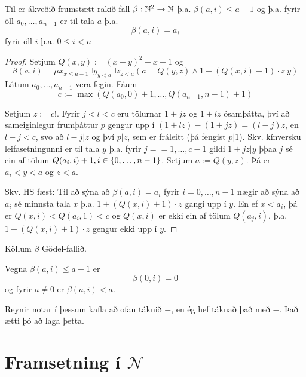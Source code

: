 \documentclass[12pt]{book}
\begin{document}
\begin{setn}
  Til er ákveðið frumstætt rakið fall $\beta: \mathbb{N}^2 \to \mathbb{N}$
  þ.a. $\beta (a,i) \leq a - 1$ og þ.a. fyrir öll $a_0, \dotsc, a_{n-1}$ er til
  tala $a$ þ.a.
  \[\beta(a,i) = a_i \]
  fyrir öll $i$ þ.a. $0 \leq i < n$
  \begin{proof}
    Setjum $Q(x,y) := (x+y)^2 + x +1$ og
    \[ \beta(a,i) = \mu x_{x \leq a - 1} \exists y_{y<a} \exists z_{z<a} (a = Q(y,z) \wedge 1 + (Q(x,i)+1) \cdot z | y ) \]
    Látum $a_0, \dotsc, a_{n-1}$ vera fegin. Fáum
    \[ c:= \max (Q(a_0,0) + 1, \dotsc, Q(a_{n-1},n-1) +1 ) \]
    
    Setjum $ z := c!$. Fyrir $j < l < c$ eru tölurnar
    $1 +jz$ og $1 + lz$ ósamþátta, því að sameiginlegur frumþáttur
    $p$ gengur upp í $(1+lz) - (1+jz) = (l-j)z$, en $l-j < c$, svo að
    $l-j | z$ og því $p|z$, sem er fráleitt (þá fengist $p | 1$). Skv.
    kínversku leifasetningunni er til tala $y$ þ.a. fyrir $j = =1, \dotsc, c-1$
    gildi $1+jz|y$ þþaa $j$ sé ein af tölum $Q(a_i,i)+1, i \in \{0,\dotsc,n-1\}$.
    Setjum $a := Q(y,z)$. Þá er $a_i < y < a$ og $ z < a$.

    Skv. HS fæst: Til að sýna að $\beta(a,i) = a_i$ fyrir $i = 0, \dotsc, n-1$
    nægir að sýna að $a_i$ sé minnsta tala $x$ þ.a.
    $1+(Q(x,i)+1)\cdot z$ gangi upp í $y$. En ef $x < a_i$,
    þá er $Q(x,i) < Q(a_i,1) < c$ og $Q(x,i)$ er
    ekki ein af tölum $Q(a_j,i)$, þ.a. $1 + (Q(x,i)+1)\cdot z$
    gengur ekki upp í $y$.
  \end{proof}
\end{setn}

\begin{skgr}
  Köllum $\beta$ Gödel-fallið.

\end{skgr}

\begin{ath}
  
  Vegna $\beta(a,i) \leq a - 1$ er 
  \[\beta(0,i) = 0\]
  og fyrir $a \neq 0$ er $\beta(a,i) < a$.
\end{ath}

\begin{ath}
  Reynir notar í þessum kafla að ofan táknið $\dot{-}$,
  en ég hef táknað það með $-$. Það ætti þó að laga þetta.
\end{ath}


\section{Framsetning í $\mathcal{N}$}
\end{document}
